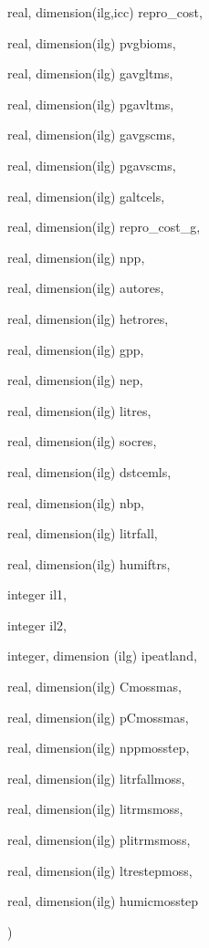 {\begin{DoxyParamCaption}
\item[{real, dimension(ilg,icc)}]{repro\+\_\+cost, }
\item[{real, dimension(ilg)}]{pvgbioms, }
\item[{real, dimension(ilg)}]{gavgltms, }
\item[{real, dimension(ilg)}]{pgavltms, }
\item[{real, dimension(ilg)}]{gavgscms, }
\item[{real, dimension(ilg)}]{pgavscms, }
\item[{real, dimension(ilg)}]{galtcels, }
\item[{real, dimension(ilg)}]{repro\+\_\+cost\+\_\+g, }
\item[{real, dimension(ilg)}]{npp, }
\item[{real, dimension(ilg)}]{autores, }
\item[{real, dimension(ilg)}]{hetrores, }
\item[{real, dimension(ilg)}]{gpp, }
\item[{real, dimension(ilg)}]{nep, }
\item[{real, dimension(ilg)}]{litres, }
\item[{real, dimension(ilg)}]{socres, }
\item[{real, dimension(ilg)}]{dstcemls, }
\item[{real, dimension(ilg)}]{nbp, }
\item[{real, dimension(ilg)}]{litrfall, }
\item[{real, dimension(ilg)}]{humiftrs, }
\item[{integer}]{il1, }
\item[{integer}]{il2, }
\item[{integer, dimension (ilg)}]{ipeatland, }
\item[{real, dimension(ilg)}]{Cmossmas, }
\item[{real, dimension(ilg)}]{p\+Cmossmas, }
\item[{real, dimension(ilg)}]{nppmosstep, }
\item[{real, dimension(ilg)}]{litrfallmoss, }
\item[{real, dimension(ilg)}]{litrmsmoss, }
\item[{real, dimension(ilg)}]{plitrmsmoss, }
\item[{real, dimension(ilg)}]{ltrestepmoss, }
\item[{real, dimension(ilg)}]{humicmosstep}
\end{DoxyParamCaption}
)}\label{balcar_8f_a922db81c881d66b3cf76a5a72ea4586a}

